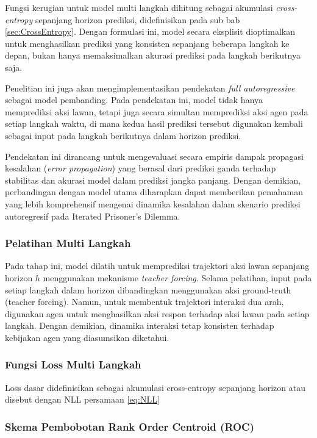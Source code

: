 Fungsi kerugian untuk model multi langkah dihitung sebagai akumulasi \textit{cross-entropy} sepanjang horizon prediksi, didefinisikan pada sub bab \ref{sec:CrossEntropy}. Dengan formulasi ini, model secara eksplisit dioptimalkan untuk menghasilkan prediksi yang konsisten sepanjang beberapa langkah ke depan, bukan hanya memaksimalkan akurasi prediksi pada langkah berikutnya saja.

Penelitian ini juga akan mengimplementasikan pendekatan \textit{full autoregressive} sebagai model pembanding. Pada pendekatan ini, model tidak hanya memprediksi aksi lawan, tetapi juga secara simultan memprediksi aksi agen pada setiap langkah waktu, di mana kedua hasil prediksi tersebut digunakan kembali sebagai input pada langkah berikutnya dalam horizon prediksi.

Pendekatan ini dirancang untuk mengevaluasi secara empiris dampak propagasi kesalahan (\textit{error propagation}) yang berasal dari prediksi ganda terhadap stabilitas dan akurasi model dalam prediksi jangka panjang. Dengan demikian, perbandingan dengan model utama diharapkan dapat memberikan pemahaman yang lebih komprehensif mengenai dinamika kesalahan dalam skenario prediksi autoregresif pada Iterated Prisoner's Dilemma.

\subsubsection{Pelatihan Multi Langkah}

Pada tahap ini, model dilatih untuk memprediksi trajektori aksi lawan sepanjang horizon $h$ menggunakan mekanisme \textit{teacher forcing}. Selama pelatihan, input pada setiap langkah dalam horizon dibandingkan menggunakan aksi ground-truth (teacher forcing). Namun, untuk membentuk trajektori interaksi dua arah, digunakan agen untuk menghasilkan aksi respon terhadap aksi lawan pada setiap langkah. Dengan demikian, dinamika interaksi tetap konsisten terhadap kebijakan agen yang diasumsikan diketahui.

\subsubsection{Fungsi Loss Multi Langkah}

Loss dasar didefinisikan sebagai akumulasi cross-entropy sepanjang horizon atau disebut dengan NLL persamaan \ref{eq:NLL}

\subsubsection{Skema Pembobotan Rank Order Centroid (ROC)}

